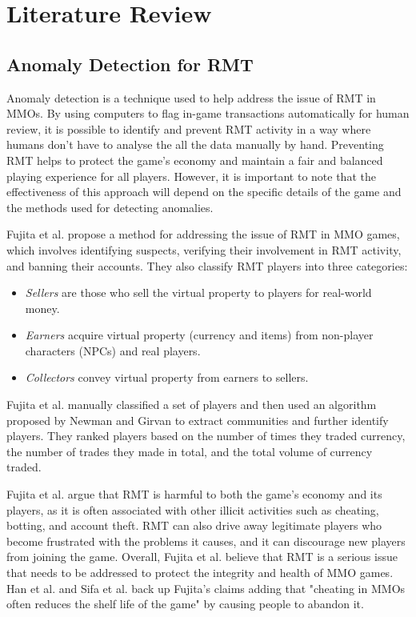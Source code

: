 \documentclass[journal]{IEEEtran}
\begin{document}
\section{Literature Review}
\subsection{Anomaly Detection for RMT}
\noindent Anomaly detection is a technique used to help address the issue of RMT in MMOs\cite{Tao2019}\cite{Ahmad2009}. By using computers to flag in-game transactions automatically for human review, it is possible to identify and prevent RMT activity in a way where humans don't have to analyse the all the data manually by hand. Preventing RMT helps to protect the game's economy and maintain a fair and balanced playing experience for all players. However, it is important to note that the effectiveness of this approach will depend on the specific details of the game and the methods used for detecting anomalies.

Fujita et al. propose a method for addressing the issue of RMT in MMO games, which involves identifying suspects, verifying their involvement in RMT activity, and banning their accounts\cite{Fujita2011}. They also classify RMT players into three categories: 
\begin{itemize}
    \item \textit{Sellers} are those who sell the virtual property to players for real-world money.
    \item \textit{Earners} acquire virtual property (currency and items) from non-player characters (NPCs) and real players.
    \item \textit{Collectors} convey virtual property from earners to sellers.
\end{itemize}

Fujita et al. manually classified a set of players and then used an algorithm proposed by Newman and Girvan\cite{Girvan2002} to extract communities and further identify players. They ranked players based on the number of times they traded currency, the number of trades they made in total, and the total volume of currency traded.

Fujita et al. argue that RMT is harmful to both the game's economy and its players, as it is often associated with other illicit activities such as cheating, botting, and account theft. RMT can also drive away legitimate players who become frustrated with the problems it causes, and it can discourage new players from joining the game\cite{Sifa2021}. Overall, Fujita et al. believe that RMT is a serious issue that needs to be addressed to protect the integrity and health of MMO games. Han et al. and Sifa et al. back up Fujita's claims adding that "cheating in MMOs often reduces the shelf life of the game" by causing people to abandon it\cite{Han2022}\cite{Sifa2021}.
\end{document}
